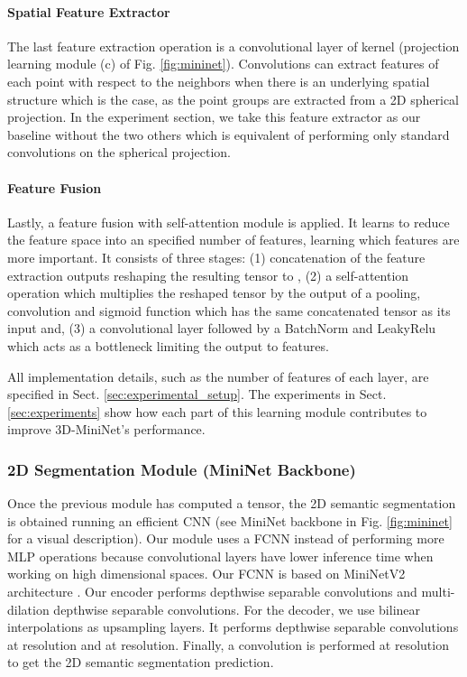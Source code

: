 \documentclass[letterpaper, 10 pt, journal, twoside]{IEEEtran}
\begin{document}
\paragraph*{Spatial Feature Extractor}
The last feature extraction operation is a convolutional layer of kernel  (projection learning module (c) of Fig. \ref{fig:mininet}).   Convolutions can extract features of each point with respect to the neighbors when there is an underlying spatial structure which is the case,  as the point groups are extracted from a 2D spherical projection.
In the experiment section, we take this feature extractor as our baseline without the two others which is equivalent of performing only standard convolutions on the spherical projection. 



\paragraph*{Feature Fusion}
Lastly, a feature fusion with self-attention module is applied. 
It learns to reduce the feature space into an specified number of features, learning which features are more important.
It consists of three stages: (1) concatenation of the feature extraction outputs reshaping  the resulting  tensor to , (2) a self-attention operation which multiplies the  reshaped tensor by the output of a pooling,  convolution and sigmoid function which has the same concatenated tensor as its input and, (3) a  convolutional layer followed by a BatchNorm and LeakyRelu which acts as a bottleneck limiting the output to  features. 

All implementation details, such as the number of features of each layer, are specified in Sect. \ref{sec:experimental_setup}. The experiments in Sect. \ref{sec:experiments} show how each part of this learning module contributes to improve 3D-MiniNet's performance.



 \subsubsection{2D Segmentation Module (MiniNet Backbone)}
Once the previous module has computed a  tensor, the 2D semantic segmentation is obtained running an efficient CNN (see MiniNet backbone in Fig. \ref{fig:mininet} for a visual description). 
Our module uses a FCNN instead of performing more MLP operations because convolutional layers have lower inference time when working on high dimensional spaces. 
Our FCNN is based on MiniNetV2 architecture \cite{alonso2020MininetV2}.  Our encoder performs  depthwise separable convolutions and  multi-dilation  depthwise separable convolutions. For the decoder, we use bilinear interpolations as upsampling layers. It performs  depthwise separable convolutions at   resolution and   at   resolution. Finally, a convolution is performed at   resolution  to get the 2D semantic segmentation prediction. 
\end{document}

